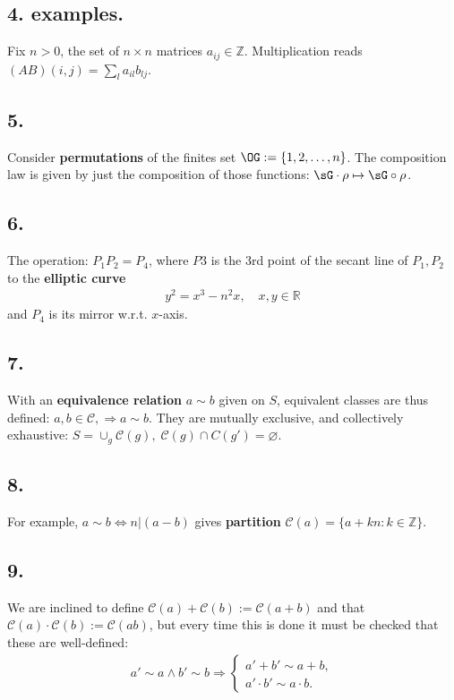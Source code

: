 \documentclass[12pt]{article}
\newcommand\M\cdot%
\newcommand\X\times%
\newcommand\Mp\mapsto%
\newcommand{\Eq}{\Leftrightarrow}%
\newcommand{\Ip}{\Rightarrow} %
\newcommand{\BF}[1]{ \mathbb{#1} }%
\newcommand{\CF}[1]{ \mathcal{#1} }%
\newcommand{\Ss}[1]{\textsf{\textbf{#1}}}%
\newcommand{\EqGo}[1]{ \begin{gather*}{#1}\end{gather*} } %
\begin{document}
\subsection*{4. examples.} Fix \(n>0\), the set of \(n \X n\) matrices \(a_{ij} \in \BF Z\). 
Multiplication reads \( (AB)(i,j) = \sum_l a_{il} b_{lj} \). 

\subsection*{5.} Consider \Ss{permutations} of the finites set \(\OG := \{1,2,\dotsc,n\}\). 
The composition law is given by just the composition of those functions: \( \sG \M \rho \Mp \sG \circ \rho \).

\subsection*{6.} The operation: \(P_1  P_2 = P_4\), where \(P3\) is the 3rd point of the secant line of \(P_1, P_2\) to the \Ss{elliptic curve} \EqGo{
 y^2 = x^3 - n^2 x,\quad x,y \in \BF{R}
} and \(P_4\) is its mirror w.r.t. \(x\)-axis. \\

\subsection*{7.} With an \Ss{equivalence relation} \(a \sim b\) given on \(S\), 
equivalent classes are thus defined: \( a,b \in \CF{C}, \Ip a \sim b \). 
They are mutually exclusive, and collectively exhaustive: \(S = \cup_g \CF{C}(g),\; \CF{C}(g) \cap C(g') = \varnothing\).

\subsection*{8.} For example, \( a \sim b \Eq n|(a-b) \) gives \Ss{partition} \( \CF{C}(a) = \{a+kn: k \in \BF Z \} \). 

\subsection*{9.} We are inclined to define \( \CF{C}(a) + \CF{C}(b) := \CF{C}(a+b) \) and that \( \CF{C}(a) \M \CF{C}(b) := \CF{C}(ab) \), 
but every time this is done it must be checked that these are well-defined: \begin{gather*}
 a' \sim a \land b' \sim b \Ip 
 \begin{cases}
  a' + b' \sim a+b, \\
  a' \M b' \sim a \M b. 
 \end{cases}
\end{gather*}
\end{document}
